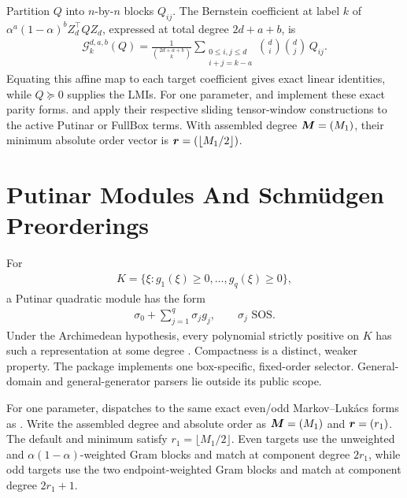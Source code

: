 Partition $Q$ into $n$-by-$n$ blocks $Q_{ij}$. The Bernstein coefficient at label $k$ of $\alpha^a(1-\alpha)^bZ_d^\top QZ_d$, expressed at total degree $2d+a+b$, is
\begin{gather*}
  \mathcal G_k^{d,a,b}(Q)=
  \frac{1}{\binom{2d+a+b}{k}}
  \sum_{\substack{0\le i,j\le d\\i+j=k-a}}
  \binom di\binom dj\,Q_{ij}.
\end{gather*}
Equating this affine map to each target coefficient gives exact linear identities, while $Q\succeq0$ supplies the LMIs. For one parameter,  and  implement these exact parity forms.  and  apply their respective sliding tensor-window constructions to the active Putinar or FullBox terms. With assembled degree $\boldsymbol{M}=(M_1)$, their minimum absolute order vector is $\boldsymbol{r}=(\lfloor M_1/2\rfloor)$.

\section{Putinar Modules And Schm\"udgen Preorderings}
\label{sec:certificate-putinar-schmudgen}

For
\begin{gather*}
  K=\{\xi:g_1(\xi)\ge0,\ldots,g_q(\xi)\ge0\},
\end{gather*}
a Putinar quadratic module has the form
\begin{gather*}
  \sigma_0+\sum_{j=1}^{q}\sigma_jg_j,\qquad \sigma_j\text{ SOS}.
\end{gather*}
Under the Archimedean hypothesis, every polynomial strictly positive on $K$ has such a representation at some degree \cite{putinar1993}. Compactness is a distinct, weaker property. The package implements one box-specific, fixed-order selector. General-domain and general-generator parsers lie outside its public scope.

For one parameter,  dispatches to the same exact even/odd Markov--Luk\'acs forms as . Write the assembled degree and absolute order as $\boldsymbol{M}=(M_1)$ and $\boldsymbol{r}=(r_1)$. The default and minimum satisfy $r_1=\lfloor M_1/2\rfloor$. Even targets use the unweighted and $\alpha(1-\alpha)$-weighted Gram blocks and match at component degree $2r_1$, while odd targets use the two endpoint-weighted Gram blocks and match at component degree $2r_1+1$.

